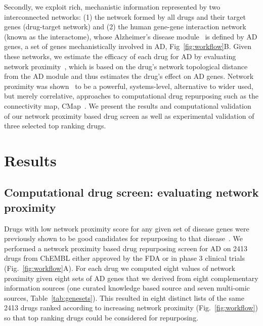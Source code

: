 \documentclass[letterpaper]{article}
\begin{document}
Secondly, we exploit rich, mechanistic information represented by two
interconnected networks: (1) the network formed by all drugs and their target
genes (drug-target network) and (2) the human gene-gene interaction network
(known as the interactome), whose Alzheimer's disease
module~\citep{Barabasi2011} is defined by AD genes, a set of genes
mechanistically involved in AD, Fig~\ref{fig:workflow}B.  Given these
networks, we estimate the efficacy of each drug for AD by evaluating network
proximity~\citep{Guney2016}, which is based on the drug's network topological
distance from the AD module and thus estimates the drug's effect on AD genes.
Network proximity was shown~\citep{Cheng2018} to be a powerful, systems-level,
alternative to wider used, but merely correlative, approaches to computational
drug repurposing such as the connectivity map, CMap~\citep{Lamb2006}.  We
present the results and computational validation of our network proximity
based drug screen as well as experimental validation of three selected top
ranking drugs.

\section{Results}

\subsection{Computational drug screen: evaluating network proximity}

Drugs with low network proximity score for any given set of disease genes were
previously shown to be good candidates for repurposing to that
disease~\citep{Cheng2018}.  We performed a network proximity based drug
repurposing screen for AD on 2413 drugs from ChEMBL either approved by the FDA
or in phase 3 clinical trials (Fig.~\ref{fig:workflow}A).  For each drug we
computed eight values of network proximity given eight sets of AD genes that
we derived from eight complementary information sources (one curated knowledge
based source and seven multi-omic sources, Table~\ref{tab:genesets}).  This
resulted in eight distinct lists of the same 2413 drugs ranked according to
increasing network proximity (Fig.~\ref{fig:workflow}) so that top ranking
drugs could be considered for repurposing.
\end{document}

